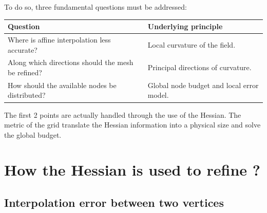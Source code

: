 \documentclass[11pt,a4paper]{article}
\begin{document}
\noindent
To do so, three fundamental questions must be addressed:
\begin{table}[htbp]
\centering
\renewcommand{\arraystretch}{1.15}
\begin{tabularx}{\linewidth}{
    >{\raggedright\arraybackslash}X
    >{\raggedright\arraybackslash}X
}
\toprule
\textbf{Question} & \textbf{Underlying principle} \\
\midrule
Where is affine interpolation less accurate?
& Local curvature of the field. \\

Along which directions should the mesh be refined?
& Principal directions of curvature. \\

How should the available nodes be distributed?
& Global node budget and local error model. \\
\bottomrule
\end{tabularx}
\end{table}

\noindent
The first 2 points are actually handled through the use of the Hessian. The metric of the grid translate the Hessian information into a physical size and solve the global budget.



\section{How the Hessian is used to refine ?}
\subsection{Interpolation error between two vertices}


\end{document}

